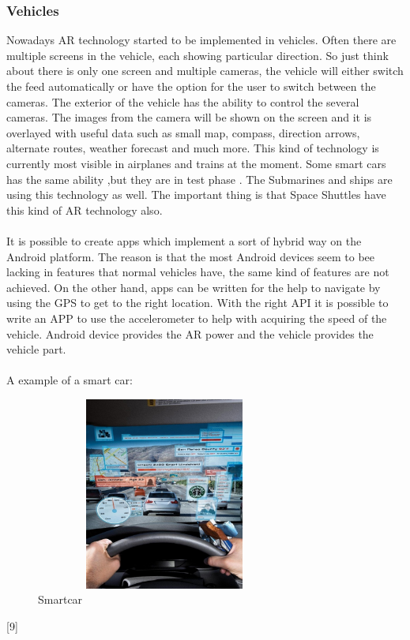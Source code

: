  \subsubsection{Vehicles}
 Nowadays AR technology started to be implemented in vehicles. Often there are multiple screens in the vehicle, each showing particular direction. So just think about there is only one screen and multiple cameras, the vehicle will either switch the feed automatically or have the option for the user to switch  between the cameras. The exterior of the vehicle has the ability to control the several cameras. The images from the camera will be shown on the screen and it is overlayed with useful data such as small map, compass, direction arrows, alternate routes, weather forecast and much more. This kind of technology is currently most visible in airplanes and trains at the moment. Some smart cars has the same ability ,but they are in test phase . The Submarines and ships are using this technology as well. The important thing is that Space Shuttles have this kind of AR technology also.
 \\
 \\
 It is possible to create apps which implement a sort of hybrid way on the Android platform. The reason is that the most Android devices seem to bee lacking in features that normal vehicles have, the same kind of features are not achieved. On the other hand, apps can be written for the help to navigate by using the GPS to get to the right location.  With the right API it is possible to write an APP to use the accelerometer to help with  acquiring the speed of the vehicle. Android device provides the AR power and the vehicle  provides the vehicle part.\cite{AugmentedBook}
 \\
 \\
 A example of a smart car:
 \begin{figure}[htbp]
 \centering
 \includegraphics[width=240pt,height=180pt,keepaspectratio]{graphics/smartcar.PNG}
 \caption{Smartcar\cite{smartcar}}
 \end{figure}
 [9]

